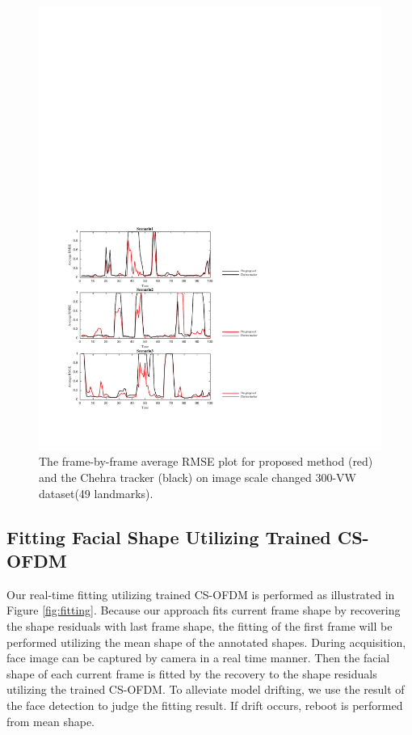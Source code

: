 \documentclass[a4paper, 10pt, conference]{ieeeconf}      %
\begin{document}
\begin{figure}[htbp]
        \centering
        \includegraphics[width=\textwidth,height=0.6\textheight]{Figures_3Secnatios2.pdf}
        \caption{
        The frame-by-frame average RMSE plot for proposed method (red) and the Chehra tracker (black) on image scale changed 300-VW dataset(49 landmarks).
        }
        \label{fig:nmse4}
\end{figure}
\subsection{Fitting Facial Shape Utilizing Trained CS-OFDM}
Our real-time fitting utilizing trained CS-OFDM is performed as illustrated in Figure \ref{fig:fitting}.
Because our approach fits current frame shape by recovering the shape residuals with last frame shape, the fitting of the first frame will be performed
utilizing the mean shape of the annotated shapes. During acquisition, face image can be captured by camera in a real time manner. 
Then the facial shape of each current frame is fitted by the recovery to the shape residuals utilizing the trained CS-OFDM.
To alleviate model drifting, we use the result of the face detection to judge the fitting result. If drift occurs, reboot is performed from mean shape.
\end{document}
